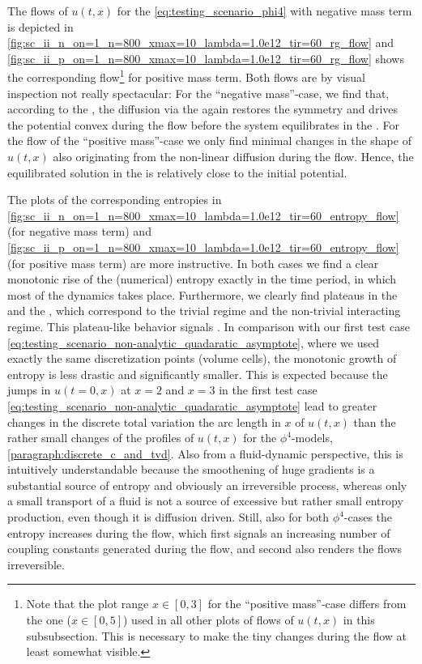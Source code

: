 The \frg{} flows of $u ( t, x )$ for the \ic{} \eqref{eq:testing_scenario_phi4} with negative mass term is depicted in \cref{fig:sc_ii_n_on=1_n=800_xmax=10_lambda=1.0e12_tir=60_rg_flow} and \cref{fig:sc_ii_p_on=1_n=800_xmax=10_lambda=1.0e12_tir=60_rg_flow} shows the corresponding \frg{} flow\footnote{%
	Note that the plot range $x\in[0,3]$ for the ``positive mass''-case  differs from the one ($x\in[0,5]$) used in all other plots of \frg{} flows of $u ( t, x )$ in this subsubsection. 
	This is necessary to make the tiny changes during the \frg{} flow at least somewhat visible.
} for positive mass term.
Both \frg{} flows are by visual inspection not really spectacular: For the ``negative mass''-case, we find that, according to the \cmwhTheoremWithRefs{}, the diffusion via the \sigmaMode{} again restores the \ZII{} symmetry and drives the potential convex during the \rg{} flow before the system equilibrates in the \ir{}.
For the \frg{} flow of the ``positive mass''-case we only find minimal changes in the shape of $u ( t, x )$ also originating from the non-linear diffusion during the \frg{} flow.
Hence, the equilibrated solution in the \ir{} is relatively close to the \uv{} initial potential.\bigskip
	
The plots of the corresponding entropies in \cref{fig:sc_ii_n_on=1_n=800_xmax=10_lambda=1.0e12_tir=60_entropy_flow} (for negative mass term) and \cref{fig:sc_ii_p_on=1_n=800_xmax=10_lambda=1.0e12_tir=60_entropy_flow} (for positive mass term) are more instructive.
In both cases we find a clear monotonic rise of the (numerical) entropy exactly in the \frg{} time period, in which most of the dynamics takes place.
Furthermore, we clearly find plateaus in the \uv{} and the \ir{}, which correspond to the trivial \uv{} regime and the non-trivial interacting \ir{} regime.
This plateau-like behavior signals \rgcy{}.
In comparison with our first test case \eqref{eq:testing_scenario_non-analytic_quadaratic_asymptote}, where we used exactly the same discretization points (volume cells), the monotonic growth of entropy is less drastic and significantly smaller.
This is expected because the jumps in $u ( t = 0, x )$ at $x = 2$ and $x = 3$ in the first test case \eqref{eq:testing_scenario_non-analytic_quadaratic_asymptote} lead to greater changes in the discrete total variation \dash{} the arc length in $x$ of $u ( t, x )$ \dash{} than the rather small changes of the profiles of $u ( t, x )$ for the $\phi^4$-models, \cf{} \cref{paragraph:discrete_c_and_tvd}. 
Also from a fluid-dynamic perspective, this is intuitively understandable because the smoothening of huge gradients is a substantial source of entropy and obviously an irreversible process, whereas only a small transport of a fluid is not a source of excessive but rather small entropy production, even though it is diffusion driven.
Still, also for both $\phi^4$-cases the entropy increases during the \frg{} flow, which first signals an increasing number of coupling constants generated during the \frg{} flow, and second also renders the flows irreversible.
	
